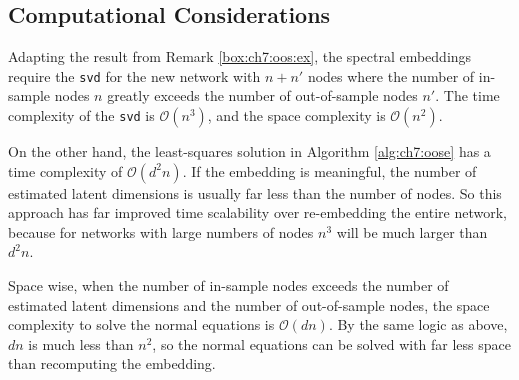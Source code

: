 \subsection{Computational Considerations}

Adapting the result from Remark \ref{box:ch7:oos:ex}, the spectral embeddings require the \texttt{svd} for the new network with $n + n'$ nodes where the number of in-sample nodes $n$ greatly exceeds the number of out-of-sample nodes $n'$. The time complexity of the \texttt{svd} is $\mathcal O\left(n^3\right)$, and the space complexity is $\mathcal O\left(n^2\right)$. 

On the other hand, the least-squares solution in Algorithm \ref{alg:ch7:oose} has a time complexity of $\mathcal O\left(d^2 n\right)$. If the embedding is meaningful, the number of estimated latent dimensions is usually far less than the number of nodes. So this approach has far improved time scalability over re-embedding the entire network, because for networks with large numbers of nodes $n^3$ will be much larger than $d^2 n$.

Space wise, when the number of in-sample nodes exceeds the number of estimated latent dimensions and the number of out-of-sample nodes, the space complexity to solve the normal equations is $\mathcal O\left(dn\right)$. By the same logic as above, $dn$ is much less than $n^2$, so the normal equations can be solved with far less space than recomputing the embedding.

\newpage